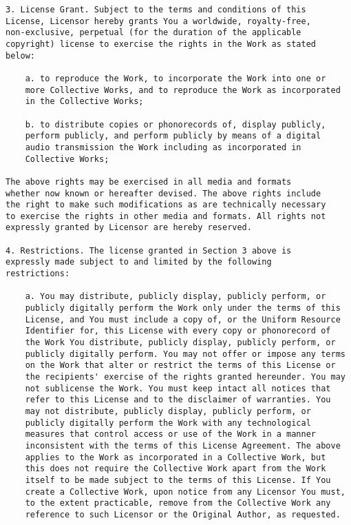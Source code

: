 \begin{verbatim}
3. License Grant. Subject to the terms and conditions of this
License, Licensor hereby grants You a worldwide, royalty-free,
non-exclusive, perpetual (for the duration of the applicable
copyright) license to exercise the rights in the Work as stated
below:

    a. to reproduce the Work, to incorporate the Work into one or
    more Collective Works, and to reproduce the Work as incorporated
    in the Collective Works;

    b. to distribute copies or phonorecords of, display publicly,
    perform publicly, and perform publicly by means of a digital
    audio transmission the Work including as incorporated in
    Collective Works;

The above rights may be exercised in all media and formats
whether now known or hereafter devised. The above rights include
the right to make such modifications as are technically necessary
to exercise the rights in other media and formats. All rights not
expressly granted by Licensor are hereby reserved.

4. Restrictions. The license granted in Section 3 above is
expressly made subject to and limited by the following
restrictions:

    a. You may distribute, publicly display, publicly perform, or
    publicly digitally perform the Work only under the terms of this
    License, and You must include a copy of, or the Uniform Resource
    Identifier for, this License with every copy or phonorecord of
    the Work You distribute, publicly display, publicly perform, or
    publicly digitally perform. You may not offer or impose any terms
    on the Work that alter or restrict the terms of this License or
    the recipients' exercise of the rights granted hereunder. You may
    not sublicense the Work. You must keep intact all notices that
    refer to this License and to the disclaimer of warranties. You
    may not distribute, publicly display, publicly perform, or
    publicly digitally perform the Work with any technological
    measures that control access or use of the Work in a manner
    inconsistent with the terms of this License Agreement. The above
    applies to the Work as incorporated in a Collective Work, but
    this does not require the Collective Work apart from the Work
    itself to be made subject to the terms of this License. If You
    create a Collective Work, upon notice from any Licensor You must,
    to the extent practicable, remove from the Collective Work any
    reference to such Licensor or the Original Author, as requested.


\end{verbatim}
